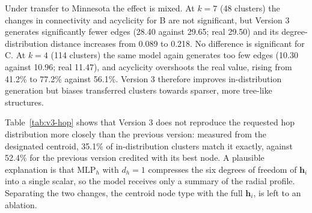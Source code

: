 Under transfer to Minnesota the effect is mixed. At $k = 7$ (48 clusters) the
changes in connectivity and acyclicity for B are not significant, but Version 3
generates significantly fewer edges (28.40 against 29.65; real 29.50) and its
degree-distribution distance increases from 0.089 to 0.218. No difference is
significant for C. At $k = 4$ (114 clusters) the same model again generates
too few edges (10.30 against 10.96; real 11.47), and acyclicity overshoots the
real value, rising from 41.2\% to 77.2\% against 56.1\%. Version 3 therefore
improves in-distribution generation but biases transferred clusters towards
sparser, more tree-like structures.

Table~\ref{tab:v3-hop} shows that Version 3 does not reproduce the requested
hop distribution more closely than the previous version: measured from the
designated centroid, 35.1\% of in-distribution clusters match it exactly,
against 52.4\% for the previous version credited with its best node. A
plausible explanation is that $\mathrm{MLP}_h$ with $d_h = 1$ compresses the
six degrees of freedom of $\mathbf{h}_i$ into a single scalar, so the model
receives only a summary of the radial profile. Separating the two changes,
the centroid node type with the full $\mathbf{h}_i$, is left to an ablation.
